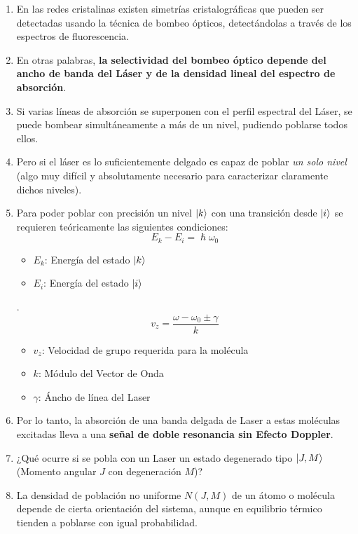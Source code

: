 \documentclass[aps,rmp,reprint,longbibliography]{revtex4-1}
\begin{document}
\begin{enumerate}
\item En las redes cristalinas existen simetrías cristalográficas que pueden ser detectadas usando la técnica de bombeo ópticos, detectándolas a través de los espectros de fluorescencia.
\item En otras palabras, \textbf{la selectividad del bombeo óptico depende del ancho de banda del Láser y de la densidad lineal del espectro de absorción}. 
\item Si varias líneas de absorción se superponen con el perfil espectral del Láser, se puede bombear simultáneamente a más de un nivel, pudiendo poblarse todos ellos. 
\item Pero si el láser es lo suficientemente delgado es capaz de poblar \textit{un solo nivel} (algo muy difícil y absolutamente necesario para caracterizar claramente dichos niveles).
\item Para poder poblar con precisión un nivel $\ket{k}$ con una transición desde $\ket{i}$ se requieren teóricamente las siguientes condiciones:
\begin{equation}\label{eq2}E_k-E_i=\hslash\omega_0\end{equation}
\begin{itemize}
    \item $E_k$: Energía del estado $\ket{k}$
    \item $E_i$: Energía del estado $\ket{i}$
\end{itemize}. 
\begin{equation}\label{eq3}v_z=\frac{\omega-\omega_0\pm\gamma}{k}\end{equation}
\begin{itemize}
    \item $v_z$: Velocidad de grupo requerida para la molécula
    \item $k$: Módulo del Vector de Onda
    \item $\gamma$: Áncho de línea del Laser
\end{itemize}
\item Por lo tanto, la absorción de una banda delgada de Laser a estas moléculas excitadas lleva a una \textbf{señal de  doble resonancia sin Efecto Doppler}.
\item ¿Qué ocurre si se pobla con un Laser un estado degenerado tipo $\ket{J,M}$ (Momento angular $J$ con degeneración $M$)?
\item La densidad de población no uniforme $N(J,M)$ de un átomo o molécula depende de cierta orientación del sistema, aunque en equilibrio térmico tienden a poblarse con igual probabilidad.

\end{enumerate}
\end{document}
